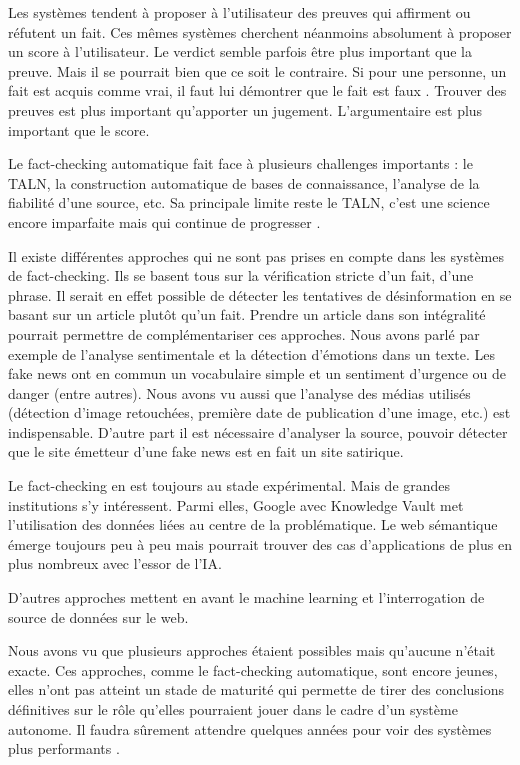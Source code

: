 Les systèmes tendent à proposer à l'utilisateur des preuves qui affirment ou réfutent un fait. Ces mêmes systèmes cherchent néanmoins absolument à proposer un score à l'utilisateur. Le verdict semble parfois être plus important que la preuve. Mais il se pourrait bien que ce soit le contraire. Si pour une personne, un fait est acquis comme vrai, il faut lui démontrer que le fait est faux \cite{cobb2013beliefs}. Trouver des preuves est plus important qu'apporter un jugement. L'argumentaire est plus important que le score.

Le fact-checking automatique fait face à plusieurs challenges importants : le TALN, la construction automatique de bases de connaissance, l'analyse de la fiabilité d'une source, etc. Sa principale limite reste le TALN, c'est une science encore imparfaite mais qui continue de progresser \cite{jozefowicz2016exploring}.

Il existe différentes approches qui ne sont pas prises en compte dans les systèmes de fact-checking. Ils se basent tous sur la vérification stricte d'un fait, d'une phrase. Il serait en effet possible de détecter les tentatives de désinformation en se basant sur un article plutôt qu'un fait. Prendre un article dans son intégralité pourrait permettre de complémentariser ces approches. Nous avons parlé par exemple de l'analyse sentimentale et la détection d'émotions dans un texte. Les fake news ont en commun un vocabulaire simple et un sentiment d'urgence ou de danger (entre autres). Nous avons vu aussi que l'analyse des médias utilisés (détection d'image retouchées, première date de publication d'une image, etc.) est indispensable. D'autre part il est nécessaire d'analyser la source, pouvoir détecter que le site émetteur d'une fake news est en fait un site satirique.

Le fact-checking en est toujours au stade expérimental. Mais de grandes institutions s'y intéressent. Parmi elles, Google avec Knowledge Vault met l'utilisation des données liées au centre de la problématique. Le web sémantique émerge toujours peu à peu mais pourrait trouver des cas d'applications de plus en plus nombreux avec l'essor de l'IA.

D'autres approches mettent en avant le machine learning et l'interrogation de source de données sur le web.

Nous avons vu que plusieurs approches étaient possibles mais qu'aucune n'était exacte. Ces approches, comme le fact-checking automatique, sont encore jeunes, elles n'ont pas atteint un stade de maturité qui permette de tirer des conclusions définitives sur le rôle qu'elles pourraient jouer dans le cadre d'un système autonome. Il faudra sûrement attendre quelques années pour voir des systèmes plus performants \cite{gravesfactsheet}.

